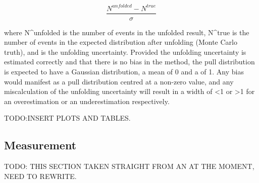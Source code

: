 \begin{equation}
\frac{N^{unfolded}-N^{true}}{\sigma}
\label{eq:pulls}
\end{equation}

where N^{unfolded} is the number of events in the unfolded result, N^{true} is the number of events in the
expected distribution after unfolding (Monte Carlo truth), and \sigma is the unfolding uncertainty. Provided
the unfolding uncertainty is estimated correctly and that there is no bias in the method, the pull
distribution is expected to have a Gaussian distribution, a mean of 0 and a \sigma of 1. Any bias would
manifest as a pull distribution centred at a non-zero value, and any miscalculation of the
unfolding uncertainty will result in a width of <1 or >1 for an overestimation or an underestimation
respectively.


TODO:INSERT PLOTS AND TABLES.

\subsection{Measurement}

\label{ss:measurement}
TODO: THIS SECTION TAKEN STRAIGHT FROM AN AT THE MOMENT, NEED TO REWRITE.

